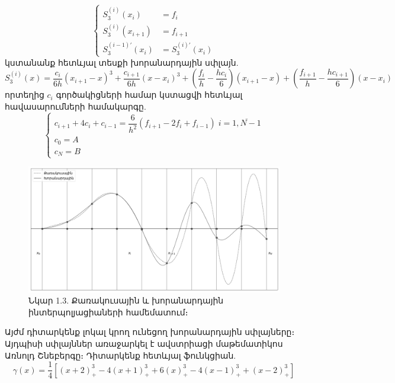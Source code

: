 \documentclass[fleqn, bachelor,subf,12pt,notitlepage]{article}
\begin{document}
\begin{equation}
\begin{cases}
				S_{3}^{(i)}(x_{i}) &=f_{i}\\
				S_{3}^{(i)}(x_{i+1}) &= f_{i+1}\\
				S_{3}^{(i-1)'}(x_{i}) &= S_{3}^{(i)'}(x_{i})

\end{cases}
\end{equation}
կստանանք հետևյալ տեսքի խորանարդային սփլայն.
\begin{equation}
	S_{3}^{(i)}(x) = \dfrac{c_{i}}{6h}\left(x_{i+1}-x\right)^{3}+\dfrac{c_{i+1}}{6h}\left(x-x_{i}\right)^{3}+\left(\dfrac{f_{i}}{h}-\dfrac{hc_{i}}{6}\right)\left(x_{i+1}-x\right)+\left(\dfrac{f_{i+1}}{h}-\dfrac{hc_{i+1}}{6}\right)\left(x-x_{i}\right)
\end{equation}
որտեղից $c_{i}$ գործակիցների համար կստացվի հետևյալ հավասարումների համակարգը.
\begin{equation}
\begin{cases}
c_{i+1}+4c_{i}+c_{i-1} = \dfrac{6}{h^2}\left(f_{i+1}-2f_{i}+f_{i-1}\right) \; i=\overline{1, N-1}\\
c_{0}=A\\
c_{N}=B
\end{cases}
\end{equation}
\begin{figure}[h!]
\centering
\includegraphics[width=1.0\textwidth]{images/quadratic_and_cubic_interploation}
\captionsetup{labelformat=empty}
\caption{\hfill Նկար 1.3. Քառակուսային և խորանարդային ինտերպոլյացիաների համեմատում։}
\end{figure}
\newpage
Այժմ դիտարկենք լոկալ կրող ունեցող խորանարդային սփլայները։ Այդպիսի սփլայններ առաջարկել է ավստրիացի մաթեմատիկոս Առնոլդ Շնեբերգը։
Դիտարկենք հետևյալ ֆունկցիան.
\begin{equation}
\gamma(x)=\dfrac{1}{4}\left[\left(x+2\right)^{3}_{+} - 4\left(x+1\right)^{3}_{+}+ 6\left(x\right)^{3}_{+} -4\left(x-1\right)^{3}_{+} + \left(x-2\right)^{3}_{+}\right]
\end{equation}
\end{document}
